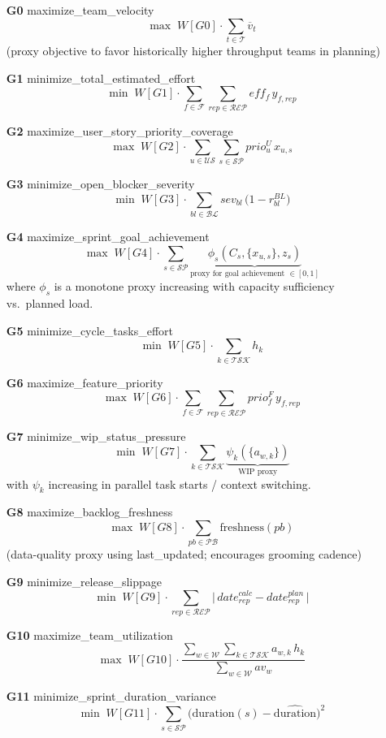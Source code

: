 \documentclass[11pt,a4paper]{article}
\begin{document}
\begin{itemize}[leftmargin=1.2cm]
  \item[\textbf{G0} maximize\_team\_velocity]
  \[
  \max \; W[G0]\cdot \sum_{t\in\mathcal{T}} \overline{v}_t
  \]
  (proxy objective to favor historically higher throughput teams in planning)
  \item[\textbf{G1} minimize\_total\_estimated\_effort]
  \[
  \min \; W[G1]\cdot \sum_{f\in\mathcal{F}} \sum_{rep\in\mathcal{REP}} eff_f \, y_{f,rep}
  \]
  \item[\textbf{G2} maximize\_user\_story\_priority\_coverage]
  \[
  \max \; W[G2]\cdot \sum_{u\in\mathcal{US}}\sum_{s\in\mathcal{SP}} prio^U_u \, x_{u,s}
  \]
  \item[\textbf{G3} minimize\_open\_blocker\_severity]
  \[
  \min \; W[G3]\cdot \sum_{bl\in\mathcal{BL}} sev_{bl}\,\bigl(1- r^{BL}_{bl}\bigr)
  \]
  \item[\textbf{G4} maximize\_sprint\_goal\_achievement]
  \[
  \max \; W[G4]\cdot \sum_{s\in\mathcal{SP}} \underbrace{\phi_s(C_s, \{x_{u,s}\}, z_s)}_{\text{proxy for goal achievement }\in[0,1]}
  \]
  where $\phi_s$ is a monotone proxy increasing with capacity sufficiency vs.\ planned load.
  \item[\textbf{G5} minimize\_cycle\_tasks\_effort]
  \[
  \min \; W[G5]\cdot \sum_{k\in\mathcal{TSK}} h_k
  \]
  \item[\textbf{G6} maximize\_feature\_priority]
  \[
  \max \; W[G6]\cdot \sum_{f\in\mathcal{F}}\sum_{rep\in\mathcal{REP}} prio^F_f \, y_{f,rep}
  \]
  \item[\textbf{G7} minimize\_wip\_status\_pressure]
  \[
  \min \; W[G7]\cdot \sum_{k\in\mathcal{TSK}} \underbrace{\psi_k(\{a_{w,k}\})}_{\text{WIP proxy}}
  \]
  with $\psi_k$ increasing in parallel task starts / context switching.
  \item[\textbf{G8} maximize\_backlog\_freshness]
  \[
  \max \; W[G8]\cdot \sum_{pb\in\mathcal{PB}} \mathrm{freshness}(pb)
  \]
  (data-quality proxy using last\_updated; encourages grooming cadence)
  \item[\textbf{G9} minimize\_release\_slippage]
  \[
  \min \; W[G9]\cdot \sum_{rep\in\mathcal{REP}} \bigl|\,date^{calc}_{rep}-date^{plan}_{rep}\,\bigr|
  \]
  \item[\textbf{G10} maximize\_team\_utilization]
  \[
  \max \; W[G10]\cdot \frac{\sum_{w\in\mathcal{W}}\sum_{k\in\mathcal{TSK}} a_{w,k}\,h_k}{\sum_{w\in\mathcal{W}} av_w}
  \]
  \item[\textbf{G11} minimize\_sprint\_duration\_variance]
  \[
  \min \; W[G11]\cdot \sum_{s\in\mathcal{SP}} \bigl(\mathrm{duration}(s)-\widehat{\mathrm{duration}}\bigr)^2
  \]
\end{itemize}
\end{document}
